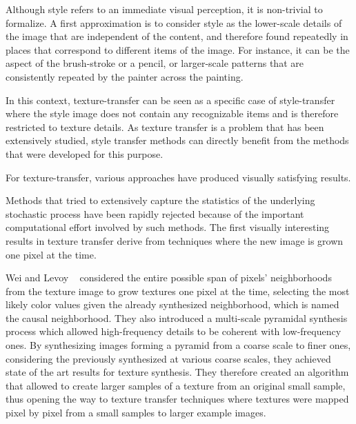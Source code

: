 \documentclass[a4paper]{article}
\begin{document}
Although style refers to an immediate visual perception, it is non-trivial to formalize. A first approximation is to consider style as the lower-scale details of the image that are independent of the content, and therefore found repeatedly in places that correspond to different items of the image. 
For instance, it can be the aspect of the brush-stroke or a pencil, or larger-scale patterns that are consistently repeated by the painter across the painting.

In this context, texture-transfer can be seen as a specific case of style-transfer where the style image does not contain any recognizable items and is therefore restricted to texture details. As texture transfer is a problem that has been extensively studied, style transfer methods can directly benefit from the methods that were developed for this purpose.

For texture-transfer, various approaches have produced visually satisfying results.

Methods that tried to extensively capture the statistics of the underlying stochastic process have been rapidly rejected because of the important computational effort involved by such methods. The first visually interesting results in texture transfer derive from techniques where the new image is grown one pixel at the time. 

Wei and Levoy ~\cite{wei-levoy} considered the entire possible span of pixels' neighborhoods from the texture image to grow textures one pixel at the time, selecting the most likely color values given the already synthesized neighborhood, which is named the causal neighborhood. They also introduced a multi-scale pyramidal synthesis process which allowed high-frequency details to be coherent with low-frequency ones. By synthesizing images forming a pyramid from a coarse scale to finer ones, considering the previously synthesized at various coarse scales, they achieved state of the art results for texture synthesis. They therefore created an algorithm that allowed to create larger samples of a texture from an original small sample, thus opening the way to texture transfer techniques where textures were mapped pixel by pixel from a small samples to larger example images.
\end{document}
